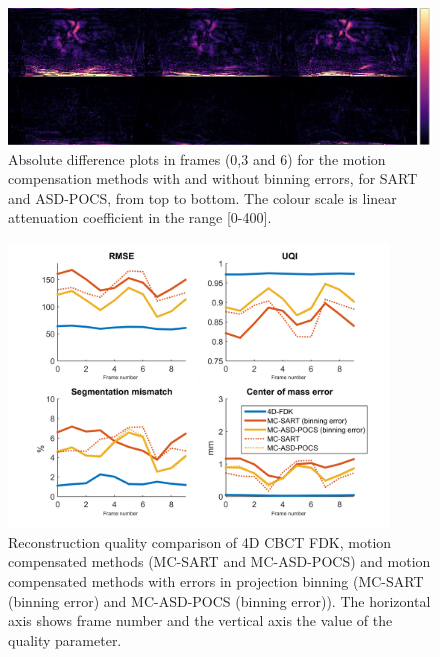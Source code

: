 \begin{figure}
\begin{center}

\includegraphics[width=\textwidth]{accuracyMC/diffbinninMCCBCT3stage.png} 


\end{center}

\caption[Three difference frames of the  motion compensation methods with projection binning errors]{\label{fig:binMCCBCT3static} Absolute difference plots in frames (0,3 and 6) for the motion compensation methods with and without binning errors, for SART and ASD-POCS, from top to bottom.  The colour scale is linear attenuation coefficient in the range [0-400].} 
\end{figure}


\begin{figure}
\begin{center}

\includegraphics[width=0.9\textwidth]{accuracyMC/binningMCCBCTparams.png} 


\end{center}

\caption[Reconstruction quality comparison of motion compensation]{\label{fig:binMCCBCTquality}  Reconstruction quality comparison of 4D CBCT FDK, motion compensated methods (MC-SART and MC-ASD-POCS) and motion compensated methods with errors in projection binning (MC-SART (binning error) and MC-ASD-POCS (binning error)). The horizontal axis shows frame number and the vertical axis the value of the quality parameter.} 
\end{figure}



